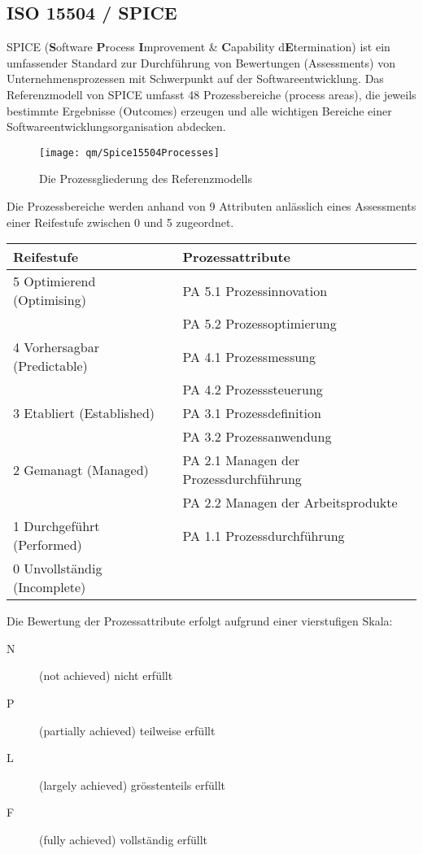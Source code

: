 \subsection{ISO 15504 / SPICE}
SPICE ({\bfseries S}oftware {\bfseries P}rocess {\bfseries I}mprovement
   \& {\bfseries C}apability d{\bfseries E}termination)
ist ein umfassender Standard zur Durchführung von Bewertungen
(Assessments) von Unternehmensprozessen mit Schwerpunkt auf der
Softwareentwicklung.
Das Referenzmodell von SPICE umfasst 48 Prozessbereiche (process
areas), die jeweils
bestimmte Ergebnisse (Outcomes) erzeugen und alle wichtigen Bereiche
einer Softwareentwicklungsorganisation abdecken.
\begin{figure}[H]
\texttt{[image: qm/Spice15504Processes]}
\caption{Die Prozessgliederung des Referenzmodells}
\end{figure}

Die Prozessbereiche werden anhand von 9 Attributen
anlässlich eines Assessments
 einer Reifestufe zwischen 0 und 5
zugeordnet.

\begin{tabular}{|l|l|}
\hline
Reifestufe & Prozessattribute \\
\hline
5 Optimierend (Optimising) &   PA 5.1 Prozessinnovation\\
              &   PA 5.2 Prozessoptimierung\\
\hline
4 Vorhersagbar (Predictable) &  PA 4.1 Prozessmessung \\
               &  PA 4.2 Prozesssteuerung\\
\hline
3 Etabliert  (Established)  &  PA 3.1 Prozessdefinition \\
               &  PA 3.2 Prozessanwendung \\
\hline
2 Gemanagt   (Managed)  & PA 2.1 Managen der Prozessdurchführung\\
               & PA 2.2 Managen der Arbeitsprodukte \\
\hline
1 Durchgeführt (Performed) & PA 1.1 Prozessdurchführung\\
\hline
0 Unvollständig (Incomplete) & \\
\hline
\end{tabular}

\newslide
Die Bewertung der Prozessattribute erfolgt
aufgrund einer vierstufigen Skala:
\begin{description}
\item[N] (not achieved) nicht erfüllt
\item[P] (partially achieved) teilweise erfüllt
\item[L] (largely achieved) grösstenteils erfüllt
\item[F] (fully achieved) vollständig erfüllt
\end{description}

